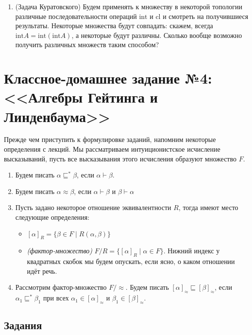 \documentclass[10pt,a4paper,oneside]{article}
\begin{document}
\begin{enumerate}
\item (Задача Куратовского) Будем применять к множеству в некоторой топологии различные 
последовательности операций $\mathrm{int}$ и $\mathrm{cl}$ и смотреть на получившиеся
результаты. Некоторые множества будут
совпадать: скажем, всегда $\mathrm{int}A = \mathrm{int}(\mathrm{int}A)$, а некоторые будут
различны. Сколько вообще возможно получить различных множеств таким способом?

\end{enumerate}

\section*{Классное-домашнее задание №4: <<Алгебры Гейтинга и Линденбаума>>}

Прежде чем приступить к формулировке заданий, напомним некоторые определения с лекций.
Мы рассматриваем интуиционистское исчисление высказываний, пусть все высказывания этого 
исчисления образуют множество $F$.

\begin{enumerate}
\item Будем писать $\alpha\sqsubseteq^*\beta$, если $\alpha\vdash\beta$.
\item Будем писать $\alpha\approx\beta$, если $\alpha\vdash\beta$ и $\beta\vdash\alpha$
\item Пусть задано некоторое отношение эквивалентности $R$, тогда имеют место следующие определения:
\begin{itemize}
\item $[\alpha]_R = \{\beta\in F \mid R(\alpha,\beta) \}$
\item \emph{(фактор-множество)} $F/R = \{[\alpha]_R \mid \alpha \in F \}$.
Нижний индекс у квадратных скобок мы будем опускать, если ясно,
о каком отношении идёт речь.
\end{itemize}
\item Рассмотрим фактор-множество $F/\!\!\approx$. Будем писать 
$[\alpha]_\approx\sqsubseteq[\beta]_\approx$, если $\alpha_1\sqsubseteq^*\beta_1$
при всех $\alpha_1\in[\alpha]_\approx$ и $\beta_1\in[\beta]_\approx$. 
\end{enumerate}

\subsection*{Задания}
\end{document}
